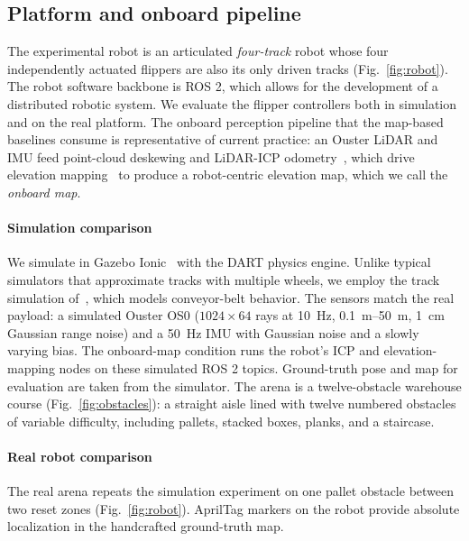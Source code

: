\subsection{Platform and onboard pipeline}
The experimental robot is an articulated \emph{four-track} robot whose four independently actuated flippers are also its only
driven tracks (Fig.~\ref{fig:robot}). The robot software backbone is ROS 2, which allows for the development of a distributed robotic system. We evaluate the flipper controllers both in simulation and on the
real platform. The onboard perception pipeline that the map-based baselines
consume is representative of current practice: an Ouster LiDAR and IMU feed point-cloud
deskewing and LiDAR-ICP odometry~\cite{norlabicpmapper,libpointmatcher}, which drive elevation
mapping~\cite{fankhauser2018} to produce a robot-centric
elevation map, which we call the \emph{onboard map}.

\paragraph{Simulation comparison} We simulate in Gazebo Ionic~\cite{gazebo2004} with the DART physics engine. Unlike
typical simulators that approximate tracks with multiple wheels, we employ the track
simulation of~\cite{pecka2017tracks}, which models conveyor-belt behavior. The sensors match the real payload: a simulated Ouster OS0
($1024\times64$ rays at \SI{10}{\hertz}, \SIrange{0.1}{50}{\metre}, \SI{1}{\centi\metre}
Gaussian range noise) and a \SI{50}{\hertz} IMU with Gaussian noise and a slowly varying
bias. The onboard-map condition runs the robot's ICP and elevation-mapping nodes on these
simulated ROS 2 topics. Ground-truth pose and map for evaluation are taken from the
simulator. The arena is a twelve-obstacle warehouse course (Fig.~\ref{fig:obstacles}): a straight aisle lined with twelve numbered obstacles of
variable difficulty, including pallets, stacked boxes, planks, and a staircase.

\paragraph{Real robot comparison} The real arena repeats the simulation experiment on one pallet obstacle between
two reset zones (Fig.~\ref{fig:robot}). AprilTag markers on the robot provide absolute localization in the handcrafted
ground-truth map.

